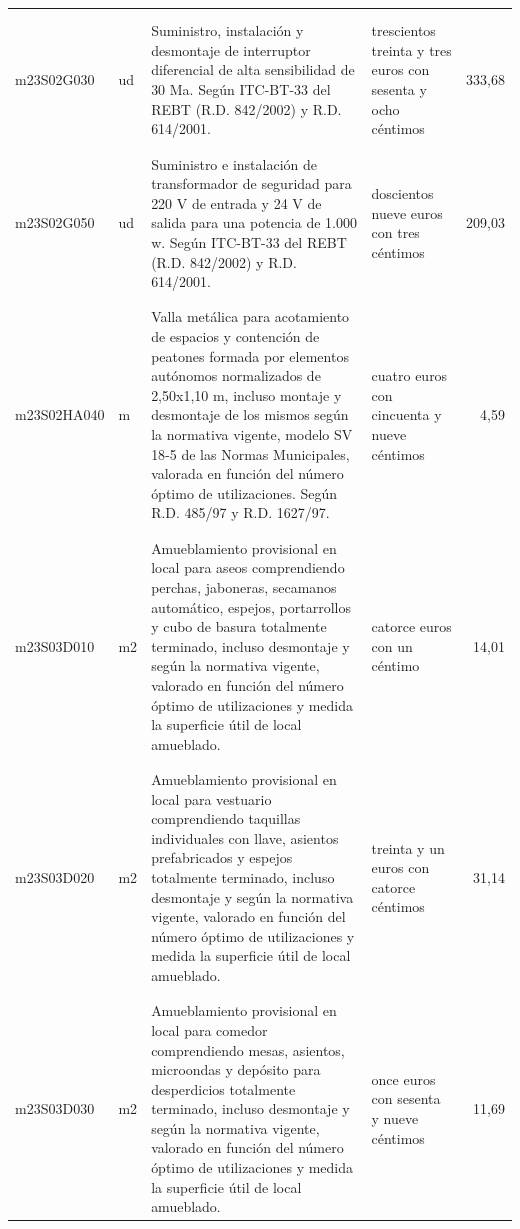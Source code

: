 \documentclass{book}%
\begin{document}
\begin{supertabular}{|l|l|p{5cm}|p{3cm}|r|}
&&&&\\%
&&&&\\%
m23S02G030&ud&Suministro, instalación y desmontaje de interruptor diferencial de alta sensibilidad de 30 Ma. Según ITC{-}BT{-}33 del REBT (R.D. 842/2002) y R.D. 614/2001.&trescientos treinta y tres euros con sesenta y ocho céntimos&333,68\\%
&&&&\\%
&&&&\\%
m23S02G050&ud&Suministro e instalación de transformador de seguridad para 220 V de entrada y 24 V de salida para una potencia de 1.000 w. Según ITC{-}BT{-}33 del REBT (R.D. 842/2002) y R.D. 614/2001.&doscientos nueve euros con tres céntimos&209,03\\%
&&&&\\%
&&&&\\%
m23S02HA040&m&Valla metálica para acotamiento de espacios y contención de peatones formada por elementos autónomos normalizados de 2,50x1,10 m, incluso montaje y desmontaje de los mismos según la normativa vigente, modelo SV 18{-}5 de las Normas Municipales, valorada en función del número óptimo de utilizaciones. Según R.D. 485/97 y R.D. 1627/97.&cuatro euros con cincuenta y nueve céntimos&4,59\\%
&&&&\\%
&&&&\\%
m23S03D010&m2&Amueblamiento provisional en local para aseos comprendiendo perchas, jaboneras, secamanos automático, espejos, portarrollos y cubo de basura totalmente terminado, incluso desmontaje y según la normativa vigente, valorado en función del número óptimo de utilizaciones y medida la superficie útil de local amueblado.&catorce euros con un céntimo&14,01\\%
&&&&\\%
&&&&\\%
m23S03D020&m2&Amueblamiento provisional en local para vestuario comprendiendo taquillas individuales con llave, asientos prefabricados y espejos totalmente terminado, incluso desmontaje y según la normativa vigente, valorado en función del número óptimo de utilizaciones y medida la superficie útil de local amueblado.&treinta y un euros con catorce céntimos&31,14\\%
&&&&\\%
&&&&\\%
m23S03D030&m2&Amueblamiento provisional en local para comedor comprendiendo mesas, asientos, microondas y depósito para desperdicios totalmente terminado, incluso desmontaje y según la normativa vigente, valorado en función del número óptimo de utilizaciones y medida la superficie útil de local amueblado.&once euros con sesenta y nueve céntimos&11,69\\%

\end{supertabular}
\end{document}
